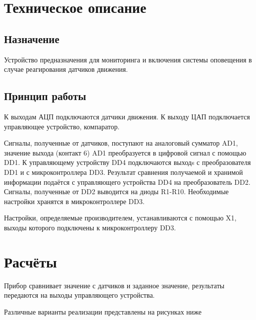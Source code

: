 	\section{Техническое описание}
		\subsection{Назначение}
				Устройство предназначения для мониторинга и включения системы оповещения в случае
			реагирования датчиков движения.
		\subsection{Принцип работы}
				К выходам АЦП подключаются датчики движения. К выходу ЦАП подключается
			управляющее устройство, компаратор.

				Сигналы, полученные от датчиков, поступают на аналоговый сумматор AD1, значение
			выхода (контакт 6) AD1 преобразуется в цифровой сигнал с помощью DD1. К
			управляющему устройству DD4 подключаются выходs с преобразователя DD1 и с микроконтроллера
			DD3. Результат сравнения получаемой и хранимой информации подаётся с управляющего
			устройства DD4 на преобразователь DD2. Сигналы, полученные от DD2 выводится на диоды
			R1-R10. Необходимые настройки хранятся в микроконтроллере DD3.

				Настройки, определяемые производителем, устанавливаются с помощью X1, выходы
			которого подключены к микроконтроллеру DD3.
	\section{Расчёты}
			Прибор сравнивает значение с датчиков и заданное значение, результаты передаются на
		выходы управляющего устройства.

			Различные варианты реализации представлены на рисунках ниже
